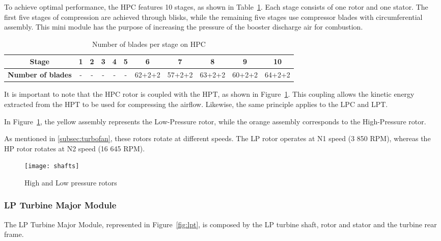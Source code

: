 To achieve optimal performance, the \gls{HPC} features 10 stages, as shown in Table~\ref{tab:bladeshpc}. Each stage consists of one rotor and one stator. The first five stages of compression are achieved through blisks, while the remaining five stages use compressor blades with circumferential assembly.
This mini module has the purpose of increasing the pressure of the booster discharge air for combustion.

\begin{table}[ht]
    \caption{Number of blades per stage on HPC \cite{ESM}}
    \label{tab:bladeshpc}
    \centering
    \begin{tabular}{ccccccccccc}
    \toprule
    \textbf{Stage} & 1 & 2 & 3 & 4 & 5 & 6 & 7 & 8 & 9 & 10 \\ \hline
    \textbf{Number of blades} & - & - & - & - & - & 62+2+2 & 57+2+2 & 63+2+2 & 60+2+2 & 64+2+2 \\ \bottomrule
    \end{tabular}
\end{table}
   

It is important to note that the HPC rotor is coupled with the HPT, as shown in Figure~\ref{fig:shafts}. This coupling allows the kinetic energy extracted from the HPT to be used for compressing the airflow. Likewise, the same principle applies to the \gls{LPC} and \gls{LPT}.

In Figure~\ref{fig:shafts}, the yellow assembly represents the Low-Pressure rotor, while the orange assembly corresponds to the High-Pressure rotor.
    
As mentioned in \ref{subsec:turbofan}, these rotors rotate at different speeds. The \gls{LP} rotor operates at N1 speed (3 850 RPM), whereas the \gls{HP} rotor rotates at N2 speed (16 645 RPM).  

\begin{figure}[H]
    \centering
    \texttt{[image: shafts]}
    \caption{High and Low pressure rotors \cite{ESM}}
    \label{fig:shafts}
    \end{figure}
    

    \subsubsection{\gls{LP} Turbine Major Module}
    \label{subsubsec:lp_turbine}

The \gls{LP} Turbine Major Module, represented in Figure~\ref{fig:lpt}, is composed by the \gls{LP} turbine shaft, rotor and stator and the turbine rear frame. 

